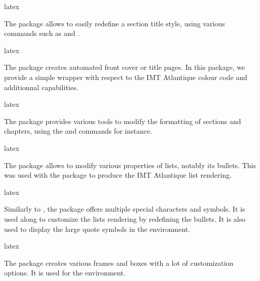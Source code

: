 \documentclass{report}
\begin{document}
\begin{imtaCode}{latex}
\RequirePackage{tikz}
\end{imtaCode}

The  package allows to easily redefine a section title style, using various commands such as  and .

\begin{imtaCode}{latex}
\RequirePackage{titlesec}
\end{imtaCode}


The  package creates automated front cover or title pages. 
In this package, we provide a simple wrapper with respect to the IMT Atlantique colour code and additionnal capabilities.

\begin{imtaCode}{latex}
\RequirePackage{titling}
\end{imtaCode}


The  package provides various tools to modify the formatting of sections and chapters, using the  and  commands for instance.

\begin{imtaCode}{latex}
\RequirePackage{secsty}
\end{imtaCode}



The  package allows to modify various properties of lists, notably its bullets. 
This was used with the  package to produce the IMT Atlantique list rendering.

\begin{imtaCode}{latex}
\RequirePackage{enumitem}
\end{imtaCode}


Similarly to , the  package offers multiple special characters and symbols. 
It is used along  to customize the lists rendering by redefining the bullets. 
It is also used to display the large quote symbols in the  environment.

\begin{imtaCode}{latex}
    \RequirePackage{pifont}
\end{imtaCode}


The  package creates various frames and boxes with a lot of customization options. 
It is used for the  environment.
\end{document}
